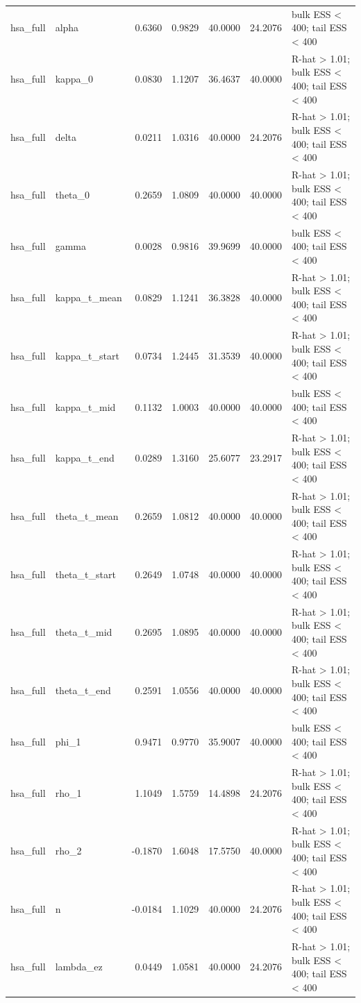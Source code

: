 \begin{tabular}{llrrrrl}
hsa\_full & alpha & 0.6360 & 0.9829 & 40.0000 & 24.2076 & bulk ESS < 400; tail ESS < 400 \\
hsa\_full & kappa\_0 & 0.0830 & 1.1207 & 36.4637 & 40.0000 & R-hat > 1.01; bulk ESS < 400; tail ESS < 400 \\
hsa\_full & delta & 0.0211 & 1.0316 & 40.0000 & 24.2076 & R-hat > 1.01; bulk ESS < 400; tail ESS < 400 \\
hsa\_full & theta\_0 & 0.2659 & 1.0809 & 40.0000 & 40.0000 & R-hat > 1.01; bulk ESS < 400; tail ESS < 400 \\
hsa\_full & gamma & 0.0028 & 0.9816 & 39.9699 & 40.0000 & bulk ESS < 400; tail ESS < 400 \\
hsa\_full & kappa\_t\_mean & 0.0829 & 1.1241 & 36.3828 & 40.0000 & R-hat > 1.01; bulk ESS < 400; tail ESS < 400 \\
hsa\_full & kappa\_t\_start & 0.0734 & 1.2445 & 31.3539 & 40.0000 & R-hat > 1.01; bulk ESS < 400; tail ESS < 400 \\
hsa\_full & kappa\_t\_mid & 0.1132 & 1.0003 & 40.0000 & 40.0000 & bulk ESS < 400; tail ESS < 400 \\
hsa\_full & kappa\_t\_end & 0.0289 & 1.3160 & 25.6077 & 23.2917 & R-hat > 1.01; bulk ESS < 400; tail ESS < 400 \\
hsa\_full & theta\_t\_mean & 0.2659 & 1.0812 & 40.0000 & 40.0000 & R-hat > 1.01; bulk ESS < 400; tail ESS < 400 \\
hsa\_full & theta\_t\_start & 0.2649 & 1.0748 & 40.0000 & 40.0000 & R-hat > 1.01; bulk ESS < 400; tail ESS < 400 \\
hsa\_full & theta\_t\_mid & 0.2695 & 1.0895 & 40.0000 & 40.0000 & R-hat > 1.01; bulk ESS < 400; tail ESS < 400 \\
hsa\_full & theta\_t\_end & 0.2591 & 1.0556 & 40.0000 & 40.0000 & R-hat > 1.01; bulk ESS < 400; tail ESS < 400 \\
hsa\_full & phi\_1 & 0.9471 & 0.9770 & 35.9007 & 40.0000 & bulk ESS < 400; tail ESS < 400 \\
hsa\_full & rho\_1 & 1.1049 & 1.5759 & 14.4898 & 24.2076 & R-hat > 1.01; bulk ESS < 400; tail ESS < 400 \\
hsa\_full & rho\_2 & -0.1870 & 1.6048 & 17.5750 & 40.0000 & R-hat > 1.01; bulk ESS < 400; tail ESS < 400 \\
hsa\_full & n & -0.0184 & 1.1029 & 40.0000 & 24.2076 & R-hat > 1.01; bulk ESS < 400; tail ESS < 400 \\
hsa\_full & lambda\_ez & 0.0449 & 1.0581 & 40.0000 & 24.2076 & R-hat > 1.01; bulk ESS < 400; tail ESS < 400 \\

\end{tabular}

